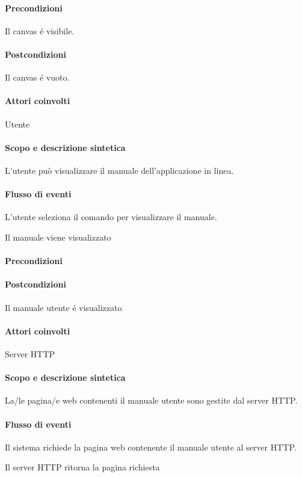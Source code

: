 \paragraph{Precondizioni} Il canvas \'e visibile.
\paragraph{Postcondizioni} Il canvas \'e vuoto.

\paragraph{Attori coinvolti} Utente
\paragraph{Scopo e descrizione sintetica}
L'utente pu\`o visualizzare il manuale dell'applicazione in linea.
\paragraph{Flusso di eventi}
\begin{elenconumerato}[\textbf{}]{\subsubsecindent}
\item L'utente seleziona il comando per visualizzare il manuale. 
\item Il manuale viene visualizzato
\end{elenconumerato}
\paragraph{Precondizioni}
\paragraph{Postcondizioni} Il manuale utente \'e visualizzato

\paragraph{Attori coinvolti} Server HTTP
\paragraph{Scopo e descrizione sintetica}
La/le pagina/e web contenenti il manuale utente sono gestite dal server HTTP.
\paragraph{Flusso di eventi}
\begin{elenconumerato}[\textbf{}]{\subsubsecindent}
\item Il sistema richiede la pagina web contenente il manuale utente al server HTTP.
\item Il server HTTP ritorna la pagina richiesta
\end{elenconumerato}
